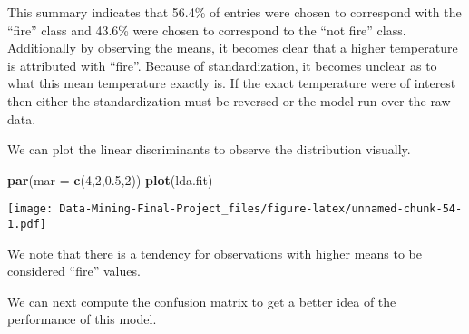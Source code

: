 \documentclass[
]{article}
\newenvironment{Shaded}{\begin{snugshade}}{\end{snugshade}}
\newcommand{\AttributeTok}[1]{\textcolor[rgb]{0.13,0.29,0.53}{#1}}
\newcommand{\CommentTok}[1]{\textcolor[rgb]{0.56,0.35,0.01}{\textit{#1}}}
\newcommand{\DecValTok}[1]{\textcolor[rgb]{0.00,0.00,0.81}{#1}}
\newcommand{\FloatTok}[1]{\textcolor[rgb]{0.00,0.00,0.81}{#1}}
\newcommand{\FunctionTok}[1]{\textcolor[rgb]{0.13,0.29,0.53}{\textbf{#1}}}
\newcommand{\NormalTok}[1]{#1}
\newcommand{\OtherTok}[1]{\textcolor[rgb]{0.56,0.35,0.01}{#1}}
\newcommand{\SpecialCharTok}[1]{\textcolor[rgb]{0.81,0.36,0.00}{\textbf{#1}}}
\begin{document}
This summary indicates that 56.4\% of entries were chosen to correspond
with the ``fire'' class and 43.6\% were chosen to correspond to the
``not fire'' class. Additionally by observing the means, it becomes
clear that a higher temperature is attributed with ``fire''. Because of
standardization, it becomes unclear as to what this mean temperature
exactly is. If the exact temperature were of interest then either the
standardization must be reversed or the model run over the raw data.

We can plot the linear discriminants to observe the distribution
visually.

\begin{Shaded}
\begin{Highlighting}[]
\FunctionTok{par}\NormalTok{(}\AttributeTok{mar =} \FunctionTok{c}\NormalTok{(}\DecValTok{4}\NormalTok{,}\DecValTok{2}\NormalTok{,}\FloatTok{0.5}\NormalTok{,}\DecValTok{2}\NormalTok{))}
\FunctionTok{plot}\NormalTok{(lda.fit)}
\end{Highlighting}
\end{Shaded}

\texttt{[image: Data-Mining-Final-Project\_files/figure-latex/unnamed-chunk-54-1.pdf]}

We note that there is a tendency for observations with higher means to
be considered ``fire'' values.

We can next compute the confusion matrix to get a better idea of the
performance of this model.

\begin{Shaded}
\end{Shaded}
\end{document}
